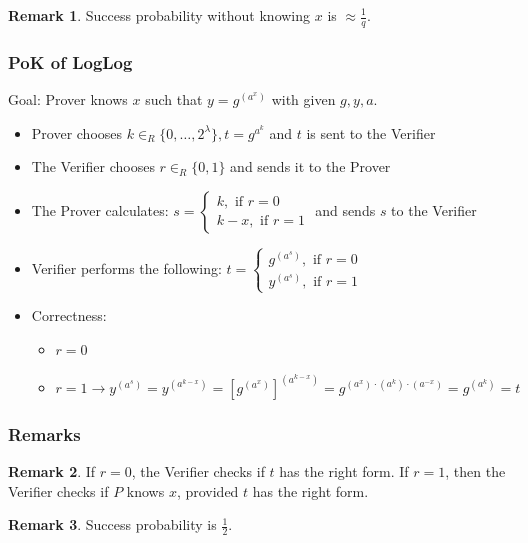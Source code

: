 \documentclass[11pt]{article}
\theoremstyle{definition}
\newtheorem{remark}{Remark}[section]
\theoremstyle{proof}
\begin{document}
\begin{remark}
	Success probability without knowing $x$ is $\approx \frac{1}{q}$.
\end{remark}

\subsubsection{PoK of LogLog}

Goal: Prover knows $x$ such that $y = g^{(a^x)}$ with given $g, y, a$.

\begin{itemize}
	\item Prover chooses $k \in_R \{0, \dots, 2^\lambda\}, t = g^{a^k}$ and $t$ is sent to the Verifier
	\item The Verifier chooses $r \in_R \{0, 1\}$ and sends it to the Prover
	\item The Prover calculates: $s = \begin{cases}
		k, \text{ if } r = 0 \\
		k-x, \text{ if } r = 1
	\end{cases}$ and sends $s$ to the Verifier
	\item Verifier performs the following: $t = \begin{cases}
		g^{(a^s)}, \text{ if } r = 0 \\
		y^{(a^s)}, \text{ if } r = 1
	\end{cases}$
	\item Correctness:
	\begin{itemize}
		\item $r = 0$ \checkmark
		\item $r = 1 \rightarrow y^{(a^s)} = y^{(a^{k-x})} = [g^{(a^x)}]^{(a^{k-x})} = g^{(a^x) \cdot (a^k) \cdot (a^{-x})} = g^{(a^k)} = t$
	\end{itemize}
\end{itemize}

\subsubsection{Remarks}

\begin{remark}
	If $r = 0$, the Verifier checks if $t$ has the right form. If $r = 1$, then the Verifier checks if $P$ knows $x$, provided $t$ has the right form.
\end{remark}

\begin{remark}
	Success probability is $\frac{1}{2}$.
\end{remark}
\end{document}
